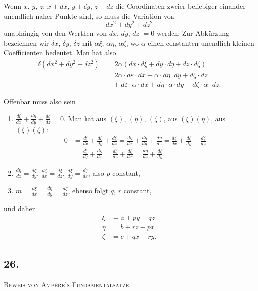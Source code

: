 \documentclass[fontsize=10pt,paper=a5,pagesize=auto]{scrbook}
\newcommand{\origpage}[1]{\marginpar{\footnotesize\textit{S. #1}}}
\begin{document}
Wenn $x$, $y$, $z$; $x + dx$, $y + dy$, $z + dz$ die Coordinaten zweier beliebiger einander unendlich naher Punkte sind, so muss die Variation von
\[
dx^2 + dy^2 + dz^2
\]
unabhängig von den Werthen von $dx$, $dy$, $dz$ $= 0$ werden. Zur Abkürzung bezeichnen wir $\delta x$, $\delta y$, $\delta z$ mit $\alpha\xi$, $\alpha\eta$, $\alpha\zeta$, wo $\alpha$ einen constanten unendlich kleinen Coefficienten bedeutet. Man hat also
\begin{align*}
\delta(dx^2 + dy^2 + dz^2) &= 2\alpha(dx \cdot d\xi + dy \cdot d\eta + dz \cdot d\zeta)\\
&= 2\alpha \cdot d\varepsilon \cdot dx + \alpha \cdot d\eta \cdot dy + d\zeta \cdot dz\\
&\quad + d\varepsilon \cdot \alpha \cdot dx + d\eta \cdot \alpha \cdot dy + d\zeta \cdot \alpha \cdot dz.
\end{align*}

Offenbar muss also sein
\begin{enumerate}[label=\arabic*.]
\item $\frac{d\xi}{dx} + \frac{d\eta}{dy} + \frac{d\zeta}{dz} = 0$. Man hat aus $(\xi)$, $(\eta)$, $(\zeta)$, aus $(\xi)(\eta)$, aus $(\xi)(\zeta)$:
\begin{align*}
0 &= \frac{d\xi}{dx} + \frac{d\xi}{dy} + \frac{d\xi}{dz} = \frac{d\eta}{dx} + \frac{d\eta}{dy} + \frac{d\eta}{dz} = \frac{d\zeta}{dx} + \frac{d\zeta}{dy} + \frac{d\zeta}{dz}\\
&= \frac{d\xi}{dy} + \frac{d\eta}{dx} = \frac{d\xi}{dz} + \frac{d\zeta}{dx} = \frac{d\eta}{dz} + \frac{d\zeta}{dy}.
\end{align*}

\item $\frac{d\eta}{dz} = \frac{d\zeta}{dy}$, $\frac{d\zeta}{dx} = \frac{d\xi}{dz}$, $\frac{d\xi}{dy} = \frac{d\eta}{dx}$, also $p$ constant,

\item $m = \frac{d\xi}{dx} = \frac{d\eta}{dy} = \frac{d\zeta}{dz}$, ebenso folgt $q$, $r$ constant,
\end{enumerate}

und daher
\begin{align*}
\xi &= a + py - qz\\
\eta &= b + rz - px\\
\zeta &= c + qx - ry.
\end{align*}

\subsection*{26.}
\origpage{629}
\textsc{Beweis von Ampère's Fundamentalsatze.}
\end{document}
